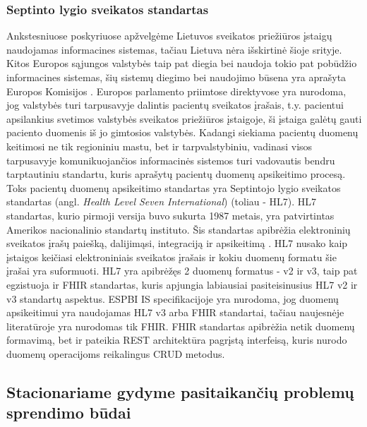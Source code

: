 \subsubsection{Septinto lygio sveikatos standartas}
Ankstesniuose poskyriuose apžvelgėme Lietuvos sveikatos priežiūros įstaigų naudojamas informacines sistemas, tačiau Lietuva nėra išskirtinė šioje srityje. Kitos Europos sąjungos valstybės taip pat diegia bei naudoja tokio pat pobūdžio informacines sistemas, šių sistemų diegimo bei naudojimo būsena yra aprašyta Europos Komisijos \cite{EuroposKomisija}. Europos parlamento priimtose direktyvose \cite{EuroposParlamentas} yra nurodoma, jog valstybės turi tarpusavyje dalintis pacientų sveikatos įrašais, t.y. pacientui apsilankius svetimos valstybės sveikatos priežiūros įstaigoje, ši įstaiga galėtų gauti paciento duomenis iš jo gimtosios valstybės. Kadangi siekiama pacientų duomenų keitimosi ne tik regioniniu mastu, bet ir tarpvalstybiniu, vadinasi visos tarpusavyje komunikuojančios informacinės sistemos turi vadovautis bendru tarptautiniu standartu, kuris aprašytų pacientų duomenų apsikeitimo procesą. Toks pacientų duomenų apsikeitimo standartas yra Septintojo lygio sveikatos standartas (angl. \textit{Health Level Seven International}) (toliau - HL7). HL7 standartas, kurio pirmoji versija buvo sukurta 1987 metais, yra patvirtintas Amerikos nacionalinio standartų instituto. Šis standartas apibrėžia elektroninių sveikatos įrašų paiešką, dalijimąsi, integraciją ir apsikeitimą \cite{HL72009}. HL7 nusako kaip įstaigos keičiasi elektroniniais sveikatos įrašais ir kokiu duomenų formatu šie įrašai yra suformuoti. HL7 yra apibrėžęs 2 duomenų formatus - v2 ir v3, taip pat egzistuoja ir FHIR standartas, kuris apjungia labiausiai pasiteisinusius HL7 v2 ir v3 standartų aspektus. ESPBI IS specifikacijoje \cite{Specifikacija} yra nurodoma, jog duomenų apsikeitimui yra naudojamas HL7 v3 arba FHIR standartai, tačiau naujesnėje literatūroje \cite{Registrucentras} yra nurodomas tik FHIR. FHIR standartas apibrėžia netik duomenų formavimą, bet ir pateikia REST architektūra pagrįstą interfeisą, kuris nurodo
duomenų operacijoms reikalingus CRUD metodus.

\subsection{Stacionariame gydyme pasitaikančių problemų sprendimo būdai}

